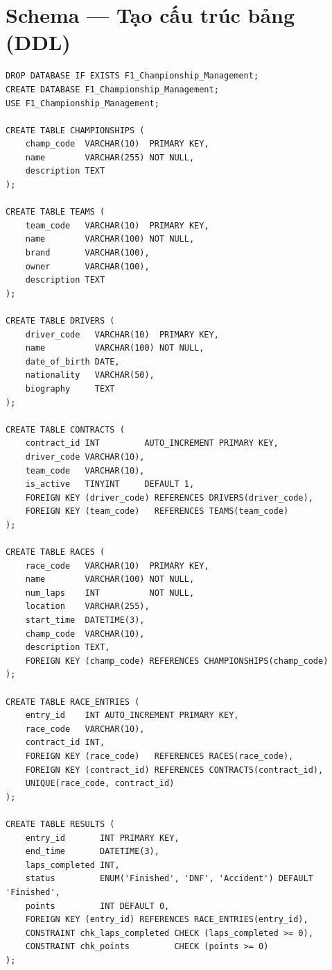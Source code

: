 \documentclass[13pt, a4paper]{report}
\begin{document}
\section{Schema --- Tạo cấu trúc bảng (DDL)}

\begin{lstlisting}[caption={DDL --- Tạo toàn bộ cấu trúc bảng}]
DROP DATABASE IF EXISTS F1_Championship_Management;
CREATE DATABASE F1_Championship_Management;
USE F1_Championship_Management;

CREATE TABLE CHAMPIONSHIPS (
    champ_code  VARCHAR(10)  PRIMARY KEY,
    name        VARCHAR(255) NOT NULL,
    description TEXT
);

CREATE TABLE TEAMS (
    team_code   VARCHAR(10)  PRIMARY KEY,
    name        VARCHAR(100) NOT NULL,
    brand       VARCHAR(100),
    owner       VARCHAR(100),
    description TEXT
);

CREATE TABLE DRIVERS (
    driver_code   VARCHAR(10)  PRIMARY KEY,
    name          VARCHAR(100) NOT NULL,
    date_of_birth DATE,
    nationality   VARCHAR(50),
    biography     TEXT
);

CREATE TABLE CONTRACTS (
    contract_id INT         AUTO_INCREMENT PRIMARY KEY,
    driver_code VARCHAR(10),
    team_code   VARCHAR(10),
    is_active   TINYINT     DEFAULT 1,
    FOREIGN KEY (driver_code) REFERENCES DRIVERS(driver_code),
    FOREIGN KEY (team_code)   REFERENCES TEAMS(team_code)
);

CREATE TABLE RACES (
    race_code   VARCHAR(10)  PRIMARY KEY,
    name        VARCHAR(100) NOT NULL,
    num_laps    INT          NOT NULL,
    location    VARCHAR(255),
    start_time  DATETIME(3),
    champ_code  VARCHAR(10),
    description TEXT,
    FOREIGN KEY (champ_code) REFERENCES CHAMPIONSHIPS(champ_code)
);

CREATE TABLE RACE_ENTRIES (
    entry_id    INT AUTO_INCREMENT PRIMARY KEY,
    race_code   VARCHAR(10),
    contract_id INT,
    FOREIGN KEY (race_code)   REFERENCES RACES(race_code),
    FOREIGN KEY (contract_id) REFERENCES CONTRACTS(contract_id),
    UNIQUE(race_code, contract_id)
);

CREATE TABLE RESULTS (
    entry_id       INT PRIMARY KEY,
    end_time       DATETIME(3),
    laps_completed INT,
    status         ENUM('Finished', 'DNF', 'Accident') DEFAULT 'Finished',
    points         INT DEFAULT 0,
    FOREIGN KEY (entry_id) REFERENCES RACE_ENTRIES(entry_id),
    CONSTRAINT chk_laps_completed CHECK (laps_completed >= 0),
    CONSTRAINT chk_points         CHECK (points >= 0)
);
\end{lstlisting}
\end{document}
